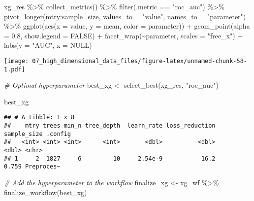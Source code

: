\documentclass[
]{book}
\newenvironment{Shaded}{\begin{snugshade}}{\end{snugshade}}
\newcommand{\AttributeTok}[1]{\textcolor[rgb]{0.77,0.63,0.00}{#1}}
\newcommand{\CommentTok}[1]{\textcolor[rgb]{0.56,0.35,0.01}{\textit{#1}}}
\newcommand{\ConstantTok}[1]{\textcolor[rgb]{0.00,0.00,0.00}{#1}}
\newcommand{\FloatTok}[1]{\textcolor[rgb]{0.00,0.00,0.81}{#1}}
\newcommand{\FunctionTok}[1]{\textcolor[rgb]{0.00,0.00,0.00}{#1}}
\newcommand{\NormalTok}[1]{#1}
\newcommand{\OtherTok}[1]{\textcolor[rgb]{0.56,0.35,0.01}{#1}}
\newcommand{\SpecialCharTok}[1]{\textcolor[rgb]{0.00,0.00,0.00}{#1}}
\newcommand{\StringTok}[1]{\textcolor[rgb]{0.31,0.60,0.02}{#1}}
\begin{document}
\begin{Shaded}
\begin{Highlighting}[]
\NormalTok{xg\_res }\SpecialCharTok{\%\textgreater{}\%}
  \FunctionTok{collect\_metrics}\NormalTok{() }\SpecialCharTok{\%\textgreater{}\%} 
  \FunctionTok{filter}\NormalTok{(.metric }\SpecialCharTok{==} \StringTok{"roc\_auc"}\NormalTok{) }\SpecialCharTok{\%\textgreater{}\%}
  \FunctionTok{pivot\_longer}\NormalTok{(mtry}\SpecialCharTok{:}\NormalTok{sample\_size,}
               \AttributeTok{values\_to =} \StringTok{"value"}\NormalTok{,}
               \AttributeTok{names\_to =} \StringTok{"parameter"}\NormalTok{) }\SpecialCharTok{\%\textgreater{}\%}
  \FunctionTok{ggplot}\NormalTok{(}\FunctionTok{aes}\NormalTok{(}\AttributeTok{x =}\NormalTok{ value, }\AttributeTok{y =}\NormalTok{ mean, }\AttributeTok{color =}\NormalTok{ parameter)) }\SpecialCharTok{+}
    \FunctionTok{geom\_point}\NormalTok{(}\AttributeTok{alpha =} \FloatTok{0.8}\NormalTok{, }\AttributeTok{show.legend =} \ConstantTok{FALSE}\NormalTok{) }\SpecialCharTok{+}
    \FunctionTok{facet\_wrap}\NormalTok{(}\SpecialCharTok{\textasciitilde{}}\NormalTok{parameter, }\AttributeTok{scales =} \StringTok{"free\_x"}\NormalTok{) }\SpecialCharTok{+}
    \FunctionTok{labs}\NormalTok{(}\AttributeTok{y =} \StringTok{"AUC"}\NormalTok{,}
         \AttributeTok{x =} \ConstantTok{NULL}\NormalTok{)}
\end{Highlighting}
\end{Shaded}

\texttt{[image: 07\_high\_dimensional\_data\_files/figure-latex/unnamed-chunk-58-1.pdf]}

\begin{Shaded}
\begin{Highlighting}[]
\CommentTok{\# Optimal hyperparameter}
\NormalTok{best\_xg }\OtherTok{\textless{}{-}} \FunctionTok{select\_best}\NormalTok{(xg\_res, }\StringTok{"roc\_auc"}\NormalTok{)}

\NormalTok{best\_xg }
\end{Highlighting}
\end{Shaded}

\begin{verbatim}
## # A tibble: 1 x 8
##    mtry trees min_n tree_depth  learn_rate loss_reduction sample_size .config   
##   <int> <int> <int>      <int>       <dbl>          <dbl>       <dbl> <chr>     
## 1     2  1827     6         10     2.54e-9           16.2       0.759 Preproces~
\end{verbatim}

\begin{Shaded}
\begin{Highlighting}[]
\CommentTok{\# Add the hyperparameter to the workflow }
\NormalTok{finalize\_xg }\OtherTok{\textless{}{-}}\NormalTok{ xg\_wf }\SpecialCharTok{\%\textgreater{}\%}
  \FunctionTok{finalize\_workflow}\NormalTok{(best\_xg)}
\end{Highlighting}
\end{Shaded}
\end{document}
